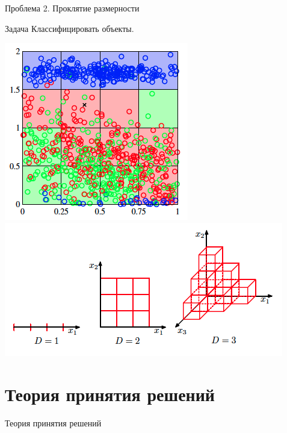 \documentclass[10pt]{beamer}
\begin{document}
\begin{frame}{Проблема 2. Проклятие размерности}

\begin{block}{Задача}
Классифицировать объекты.
\end{block}

\begin{center}
\includegraphics[scale=0.3]{images/pts.png}
\includegraphics[scale=0.4]{images/curse.png}
\end{center}

\end{frame}

\section{Теория принятия решений}

\begin{frame}{}

\begin{center}
\Large Теория принятия решений
\end{center}

\end{frame}
\end{document}

